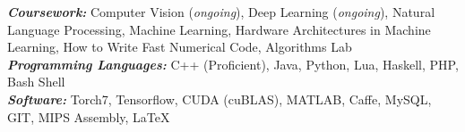 \documentclass[9pt]{article}
\newenvironment{changemargin}[2]{%
  \begin{list}{}{%
    \setlength{\topsep}{0pt}%
    \setlength{\leftmargin}{#1}%
    \setlength{\rightmargin}{#2}%
    \setlength{\listparindent}{\parindent}%
    \setlength{\itemindent}{\parindent}%
    \setlength{\parsep}{\parskip}%
  }%
  \item[]}{\end{list}
}
\newenvironment{body} {
	\vspace*{-16pt}
	\begin{changemargin}{-0.6in}{-0.65in}
  }	
	{\end{changemargin}
}
\begin{document}
\vspace{3 mm}
\begin{body}
	\vspace{14pt}
	\begin{changemargin}{0.15in}{0.15in}
	\emph{\textbf{Coursework:}} Computer Vision (\emph{ongoing}), Deep Learning (\emph{ongoing}), Natural Language Processing, Machine Learning, Hardware Architectures in Machine Learning, How to Write Fast Numerical Code,	 Algorithms Lab \\
	\emph{\textbf{Programming Languages: }}{} C++ (Proficient), Java, Python, Lua, Haskell, PHP, Bash Shell\\
	\emph{\textbf{Software: }}{} Torch7, Tensorflow, CUDA (cuBLAS), MATLAB, Caffe, MySQL, GIT, MIPS Assembly, \LaTeX \\
	\end{changemargin}
\end{body}
\end{document}
